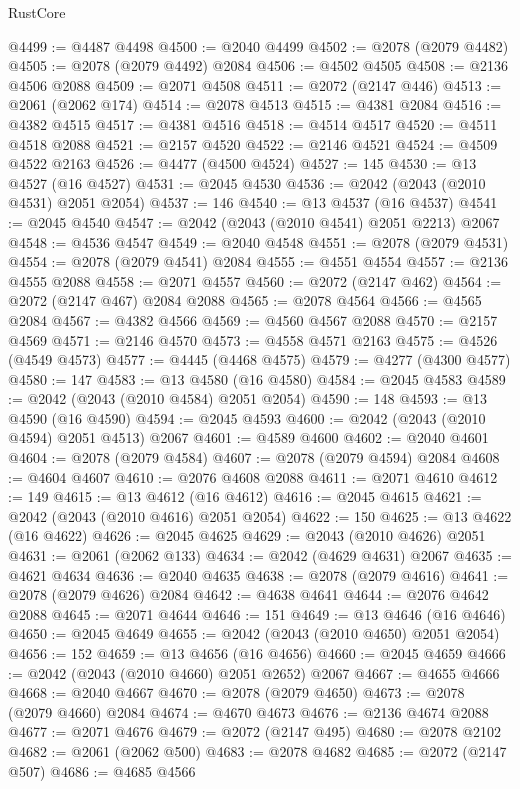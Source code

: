 \begin{lexlean}{RustCore}
\begin{coremodule}
@4499 := @4487 @4498
@4500 := @2040 @4499
@4502 := @2078 (@2079 @4482)
@4505 := @2078 (@2079 @4492) @2084
@4506 := @4502 @4505
@4508 := @2136 @4506 @2088
@4509 := @2071 @4508
@4511 := @2072 (@2147 @446)
@4513 := @2061 (@2062 @174)
@4514 := @2078 @4513
@4515 := @4381 @2084
@4516 := @4382 @4515
@4517 := @4381 @4516
@4518 := @4514 @4517
@4520 := @4511 @4518 @2088
@4521 := @2157 @4520
@4522 := @2146 @4521
@4524 := @4509 @4522 @2163
@4526 := @4477 (@4500 @4524)
@4527 := 145
@4530 := @13 @4527 (@16 @4527)
@4531 := @2045 @4530
@4536 := @2042 (@2043 (@2010 @4531) @2051 @2054)
@4537 := 146
@4540 := @13 @4537 (@16 @4537)
@4541 := @2045 @4540
@4547 := @2042 (@2043 (@2010 @4541) @2051 @2213) @2067
@4548 := @4536 @4547
@4549 := @2040 @4548
@4551 := @2078 (@2079 @4531)
@4554 := @2078 (@2079 @4541) @2084
@4555 := @4551 @4554
@4557 := @2136 @4555 @2088
@4558 := @2071 @4557
@4560 := @2072 (@2147 @462)
@4564 := @2072 (@2147 @467) @2084 @2088
@4565 := @2078 @4564
@4566 := @4565 @2084
@4567 := @4382 @4566
@4569 := @4560 @4567 @2088
@4570 := @2157 @4569
@4571 := @2146 @4570
@4573 := @4558 @4571 @2163
@4575 := @4526 (@4549 @4573)
@4577 := @4445 (@4468 @4575)
@4579 := @4277 (@4300 @4577)
@4580 := 147
@4583 := @13 @4580 (@16 @4580)
@4584 := @2045 @4583
@4589 := @2042 (@2043 (@2010 @4584) @2051 @2054)
@4590 := 148
@4593 := @13 @4590 (@16 @4590)
@4594 := @2045 @4593
@4600 := @2042 (@2043 (@2010 @4594) @2051 @4513) @2067
@4601 := @4589 @4600
@4602 := @2040 @4601
@4604 := @2078 (@2079 @4584)
@4607 := @2078 (@2079 @4594) @2084
@4608 := @4604 @4607
@4610 := @2076 @4608 @2088
@4611 := @2071 @4610
@4612 := 149
@4615 := @13 @4612 (@16 @4612)
@4616 := @2045 @4615
@4621 := @2042 (@2043 (@2010 @4616) @2051 @2054)
@4622 := 150
@4625 := @13 @4622 (@16 @4622)
@4626 := @2045 @4625
@4629 := @2043 (@2010 @4626) @2051
@4631 := @2061 (@2062 @133)
@4634 := @2042 (@4629 @4631) @2067
@4635 := @4621 @4634
@4636 := @2040 @4635
@4638 := @2078 (@2079 @4616)
@4641 := @2078 (@2079 @4626) @2084
@4642 := @4638 @4641
@4644 := @2076 @4642 @2088
@4645 := @2071 @4644
@4646 := 151
@4649 := @13 @4646 (@16 @4646)
@4650 := @2045 @4649
@4655 := @2042 (@2043 (@2010 @4650) @2051 @2054)
@4656 := 152
@4659 := @13 @4656 (@16 @4656)
@4660 := @2045 @4659
@4666 := @2042 (@2043 (@2010 @4660) @2051 @2652) @2067
@4667 := @4655 @4666
@4668 := @2040 @4667
@4670 := @2078 (@2079 @4650)
@4673 := @2078 (@2079 @4660) @2084
@4674 := @4670 @4673
@4676 := @2136 @4674 @2088
@4677 := @2071 @4676
@4679 := @2072 (@2147 @495)
@4680 := @2078 @2102
@4682 := @2061 (@2062 @500)
@4683 := @2078 @4682
@4685 := @2072 (@2147 @507)
@4686 := @4685 @4566

\end{coremodule}
\end{lexlean}
